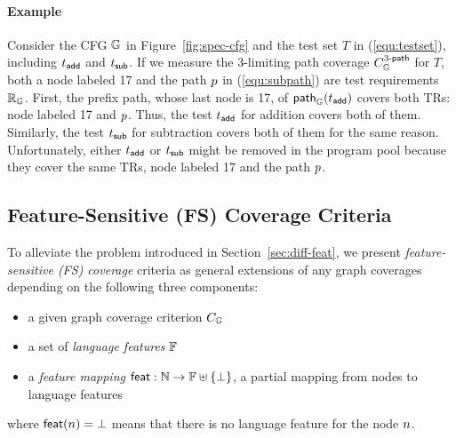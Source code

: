 \paragraph{\textbf{Example}}
%
Consider the CFG $\mathbb{G}$ in Figure~\ref{fig:spec-cfg} and the test
set $T$ in (\ref{equ:testset}), including $t_{\textsf{add}}$ and $t_{\textsf{sub}}$.
%
If we measure the 3-limiting path coverage $C_{\mathbb{G}}^{{3}\textsf{-path}}$ for
$T$, both a node labeled 17 and the path $p$ in (\ref{equ:subpath}) are
test requirements $\mathbb{R}_{\mathbb{G}}$.
%
First, the prefix path, whose last node is 17, of $\textsf{path}_{\mathbb{G}}(t_{\textsf{add}})$
covers both TRs: node labeled 17 and $p$.
%
Thus, the test $t_{\textsf{add}}$ for addition covers both of them.
%
Similarly, the test $t_{\textsf{sub}}$ for subtraction covers both of them for the same
reason.
%
Unfortunately, either $t_{\textsf{add}}$ or $t_{\textsf{sub}}$ might be removed in the program
pool because they cover the same TRs, node labeled 17 and the path $p$.




\subsection{Feature-Sensitive (FS) Coverage Criteria}\label{sec:fs-cov}

To alleviate the problem introduced in Section~\ref{sec:diff-feat}, we present
\textit{feature-sensitive (FS) coverage} criteria as general extensions of any
graph coverages depending on the following three components:
%
\begin{itemize}
  \item a given graph coverage criterion $C_{\mathbb{G}}$
  \item a set of \textit{language features} $\mathbb{F}$
  \item a \textit{feature mapping} $\textsf{feat}: \mathbb{N} \rightarrow \mathbb{F}
    \uplus \{ \bot \}$, a partial mapping from nodes to language features
\end{itemize}
%
where $\textsf{feat}(n) = \bot$ means that there is no language feature for the
node $n$.



